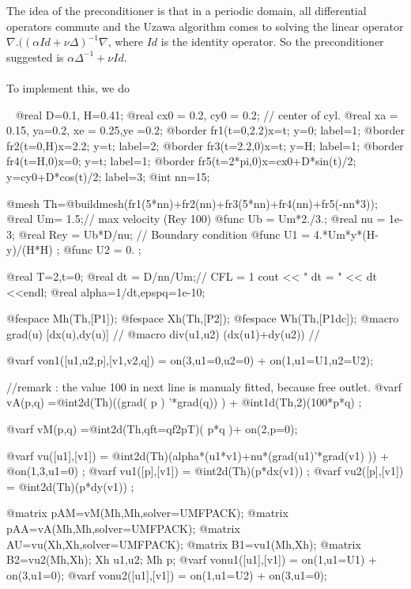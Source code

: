 \documentclass[a4paper,twoside,12pt]{book}
\begin{document}
 The idea of the preconditioner is that in a periodic domain, all
 differential operators commute and  the  Uzawa algorithm comes to solving the
 linear operator  $ \nabla. ( (\alpha Id + \nu \Delta)^{-1} \nabla$,
 where $ Id $ is the identity operator.
 So  the preconditioner suggested is $ \alpha \Delta^{-1} + \nu Id$.
\\\\
To implement this, we do 

\begin{example}~
\bFF
@real D=0.1, H=0.41;
@real cx0 = 0.2, cy0 = 0.2; // center of cyl. 
@real xa = 0.15, ya=0.2, xe = 0.25,ye =0.2;
@border fr1(t=0,2.2){x=t; y=0; label=1;}
@border fr2(t=0,H){x=2.2; y=t; label=2;}
@border fr3(t=2.2,0){x=t; y=H; label=1;}
@border fr4(t=H,0){x=0; y=t; label=1;}
@border fr5(t=2*pi,0){x=cx0+D*sin(t)/2; y=cy0+D*cos(t)/2; label=3;}
@int nn=15;
 
@mesh Th=@buildmesh(fr1(5*nn)+fr2(nn)+fr3(5*nn)+fr4(nn)+fr5(-nn*3));
@real Um= 1.5;// max velocity (Rey 100) 
@func Ub = Um*2./3.; 
@real nu = 1e-3; 
@real Rey = Ub*D/nu;
// Boundary condition 
@func U1 = 4.*Um*y*(H-y)/(H*H)  ;
@func U2 = 0. ;

@real T=2,t=0; 
@real dt = D/nn/Um;// CFL = 1 
 cout << " dt = " << dt <<endl;
@real alpha=1/dt,epspq=1e-10;


@fespace Mh(Th,[P1]);
@fespace Xh(Th,[P2]);
@fespace Wh(Th,[P1dc]);
@macro grad(u) [dx(u),dy(u)] //
@macro div(u1,u2) (dx(u1)+dy(u2)) //

 
 @varf von1([u1,u2,p],[v1,v2,q]) =  on(3,u1=0,u2=0) + on(1,u1=U1,u2=U2);

  
//remark : the value 100 in next line is manualy fitted, because free outlet. 
 @varf vA(p,q) =@int2d(Th)((grad( p ) '*grad(q)) ) + @int1d(Th,2)(100*p*q) ;

 @varf vM(p,q) =@int2d(Th,qft=qf2pT)(  p*q )+ on(2,p=0);

 @varf vu([u1],[v1]) = @int2d(Th)(alpha*(u1*v1)+nu*(grad(u1)'*grad(v1) )) 
                       + @on(1,3,u1=0) ;
 @varf vu1([p],[v1]) = @int2d(Th)(p*dx(v1)) ;
 @varf vu2([p],[v1]) = @int2d(Th)(p*dy(v1)) ;
   

 @matrix pAM=vM(Mh,Mh,solver=UMFPACK); 
 @matrix pAA=vA(Mh,Mh,solver=UMFPACK); 
 @matrix AU=vu(Xh,Xh,solver=UMFPACK); 
 @matrix B1=vu1(Mh,Xh);
 @matrix B2=vu2(Mh,Xh);
 Xh u1,u2;
 Mh p;
@varf vonu1([u1],[v1]) =  on(1,u1=U1) + on(3,u1=0);
@varf vonu2([u1],[v1]) =  on(1,u1=U2) + on(3,u1=0);



\end{example}
\end{document}
